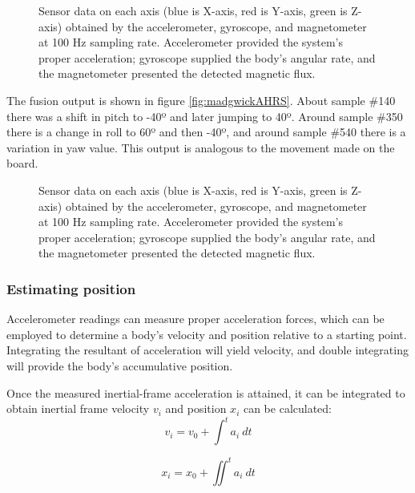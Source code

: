 \begin{figure}[!h]
    \centering
    \resizebox{1\linewidth}{!}{}
    \caption{Sensor data on each axis (blue is X-axis, red is Y-axis, green is Z-axis) obtained by the accelerometer, gyroscope, and magnetometer at 100 Hz sampling rate. Accelerometer provided the system’s proper acceleration; gyroscope supplied the body’s angular rate, and the magnetometer presented the detected magnetic flux.}
\end{figure}

The fusion output is shown in figure \ref{fig:madgwickAHRS}. About sample \#140 there was a shift in pitch to -40º and later jumping to 40º. Around sample \#350 there is a change in roll to 60º and then -40º, and around sample \#540 there is a variation in yaw value. This output is analogous to the movement made on the board.

\begin{figure}
    \centering
    \resizebox{1\linewidth}{!}{}
    \caption{Sensor data on each axis (blue is X-axis, red is Y-axis, green is Z-axis) obtained by the accelerometer, gyroscope, and magnetometer at 100 Hz sampling rate. Accelerometer provided the system’s proper acceleration; gyroscope supplied the body’s angular rate, and the magnetometer presented the detected magnetic flux.}
\end{figure}

\subsubsection{Estimating position}
Accelerometer readings can measure proper acceleration forces, which can be employed to determine a body's velocity and position relative to a starting point. Integrating the resultant of acceleration will yield velocity, and double integrating will provide the body's accumulative position.

Once the measured inertial-frame acceleration is attained, it can be integrated to obtain inertial frame velocity $v_i$  and position $x_i$ can be calculated:
\begin{equation}
    v_i = v_0 +  \int^t a_i~dt
\end{equation}

\begin{equation}
    x_i = x_0 + \iint^t a_i~dt
\end{equation}

